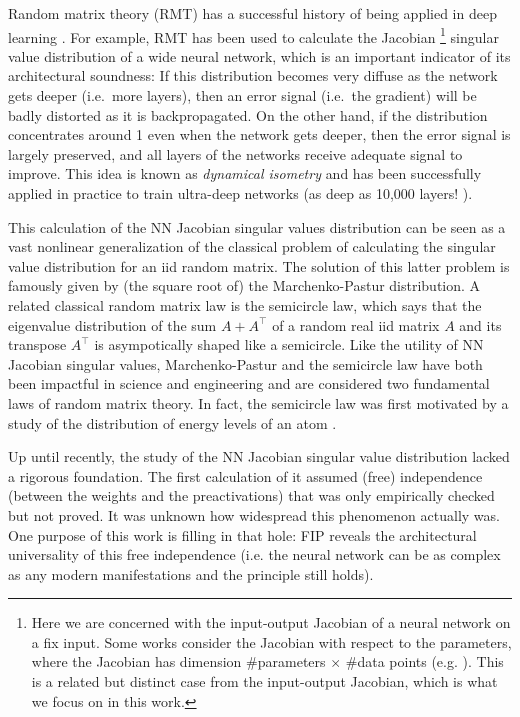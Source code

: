 \documentclass{article}
\theoremstyle{definition}
\theoremstyle{remark}
\newcommand{\trsp}{\top}
\begin{document}
Random matrix theory (RMT) has a successful history of being applied in deep learning \citep{pennington_resurrecting_2017,pennington_emergence_2018,tarnowski_dynamical_2018,ling_spectrum_2019,xiao_dynamical_2018}. For example, RMT has been used to calculate the Jacobian%
\footnote{Here we are concerned with the input-output Jacobian of a neural network on a fix input. Some works consider the Jacobian with respect to the parameters, where the Jacobian has dimension \#parameters $\times$ \#data points (e.g. \citep{pennington_spectrum_2018}). This is a related but distinct case from the input-output Jacobian, which is what we focus on in this work.}
singular value distribution of a wide neural network, which is an important indicator of its architectural soundness: If this distribution becomes very diffuse as the network gets deeper (i.e.\ more layers), then an error signal (i.e.\ the gradient) will be badly distorted as it is backpropagated. On the other hand, if the distribution concentrates around 1 even when the network gets deeper, then the error signal is largely preserved, and all layers of the networks receive adequate signal to improve. This idea is known as \emph{dynamical isometry} \citep{pennington_resurrecting_2017} and has been successfully applied in practice to train ultra-deep networks (as deep as 10,000 layers! \citep{xiao_dynamical_2018}).

This calculation of the NN Jacobian singular values distribution can be seen as a vast nonlinear generalization of the classical problem of calculating the singular value distribution for an iid random matrix. The solution of this latter problem is famously given by (the square root of) the Marchenko-Pastur distribution. A related classical random matrix law is the semicircle law, which says that the eigenvalue distribution of the sum $A+A^{\trsp}$ of a random real iid matrix $A$ and its transpose $A^{\trsp}$ is asympotically shaped like a semicircle. Like the utility of NN Jacobian singular values, Marchenko-Pastur and the semicircle law have both been impactful in science and engineering and are considered two fundamental laws of random matrix theory. In fact, the semicircle law was first motivated by a study of the distribution of energy levels of an atom \citep{lane_giant_1955}.

Up until recently, the study of the NN Jacobian singular value distribution lacked a rigorous foundation. The first calculation of it assumed (free) independence (between the weights and the preactivations) that was only empirically checked but not proved. It was unknown how widespread this phenomenon actually was. One purpose of this work is filling in that hole: FIP reveals the architectural universality of this free independence (i.e. the neural network can be as complex as any modern manifestations and the principle still holds).
\end{document}
